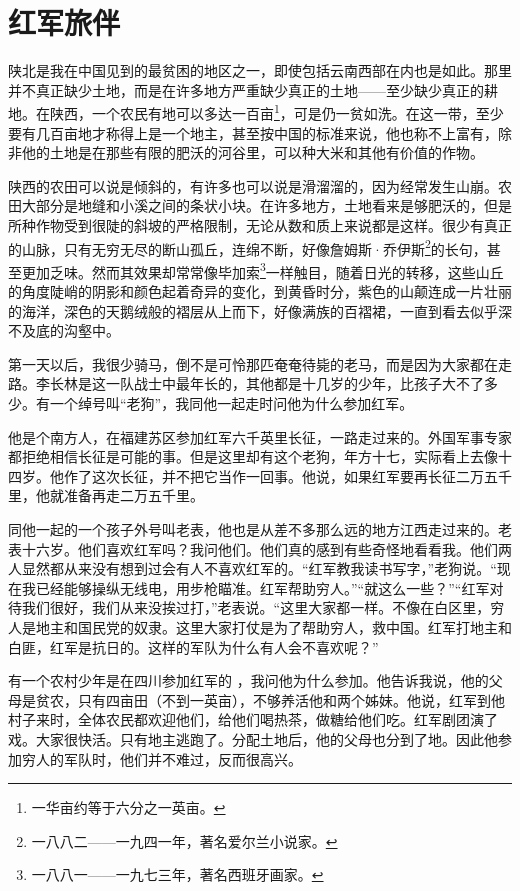 \documentclass[10pt]{book}
\begin{document}
\section{红军旅伴}

陕北是我在中国见到的最贫困的地区之一，即使包括云南西部在内也是如此。那里并不真正缺少土地，而是在许多地方严重缺少真正的土地——至少缺少真正的耕地。在陕西，一个农民有地可以多达一百亩\footnote{一华亩约等于六分之一英亩。}，可是仍一贫如洗。在这一带，至少要有几百亩地才称得上是一个地主，甚至按中国的标准来说，他也称不上富有，除非他的土地是在那些有限的肥沃的河谷里，可以种大米和其他有价值的作物。

陕西的农田可以说是倾斜的，有许多也可以说是滑溜溜的，因为经常发生山崩。农田大部分是地缝和小溪之间的条状小块。在许多地方，土地看来是够肥沃的，但是所种作物受到很陡的斜坡的严格限制，无论从数和质上来说都是这样。很少有真正的山脉，只有无穷无尽的断山孤丘，连绵不断，好像詹姆斯·乔伊斯\footnote{一八八二——一九四一年，著名爱尔兰小说家。}的长句，甚至更加乏味。然而其效果却常常像毕加索\footnote{一八八一——一九七三年，著名西班牙画家。}一样触目，随着日光的转移，这些山丘的角度陡峭的阴影和颜色起着奇异的变化，到黄昏时分，紫色的山颠连成一片壮丽的海洋，深色的天鹅绒般的褶层从上而下，好像满族的百褶裙，一直到看去似乎深不及底的沟壑中。

第一天以后，我很少骑马，倒不是可怜那匹奄奄待毙的老马，而是因为大家都在走路。李长林是这一队战士中最年长的，其他都是十几岁的少年，比孩子大不了多少。有一个绰号叫“老狗”，我同他一起走时问他为什么参加红军。

他是个南方人，在福建苏区参加红军六千英里长征，一路走过来的。外国军事专家都拒绝相信长征是可能的事。但是这里却有这个老狗，年方十七，实际看上去像十四岁。他作了这次长征，并不把它当作一回事。他说，如果红军要再长征二万五千里，他就准备再走二万五千里。

同他一起的一个孩子外号叫老表，他也是从差不多那么远的地方江西走过来的。老表十六岁。他们喜欢红军吗？我问他们。他们真的感到有些奇怪地看看我。他们两人显然都从来没有想到过会有人不喜欢红军的。“红军教我读书写字，”老狗说。“现在我已经能够操纵无线电，用步枪瞄准。红军帮助穷人。”“就这么一些？”“红军对待我们很好，我们从来没挨过打，”老表说。“这里大家都一样。不像在白区里，穷人是地主和国民党的奴隶。这里大家打仗是为了帮助穷人，救中国。红军打地主和白匪，红军是抗日的。这样的军队为什么有人会不喜欢呢？”

有一个农村少年是在四川参加红军的 ，我问他为什么参加。他告诉我说，他的父母是贫农，只有四亩田（不到一英亩），不够养活他和两个姊妹。他说，红军到他村子来时，全体农民都欢迎他们，给他们喝热茶，做糖给他们吃。红军剧团演了戏。大家很快活。只有地主逃跑了。分配土地后，他的父母也分到了地。因此他参加穷人的军队时，他们并不难过，反而很高兴。
\end{document}

